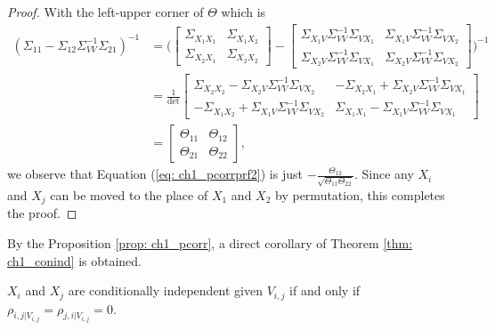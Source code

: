 \begin{proof}
    With the left-upper corner of $\Theta$ which is
    \begin{align*}
        (\Sigma_{11}-\Sigma_{12}\Sigma_{VV}^{-1}\Sigma_{21})^{-1} &= \bigg(\begin{bmatrix}
            \Sigma_{X_1X_1} & \Sigma_{X_1X_2} \\
            \Sigma_{X_2X_1} & \Sigma_{X_2X_2}
        \end{bmatrix}-\begin{bmatrix}
            \Sigma_{X_1V}\Sigma_{VV}^{-1}\Sigma_{VX_1} & \Sigma_{X_1V}\Sigma_{VV}^{-1}\Sigma_{VX_2} \\
            \Sigma_{X_2V}\Sigma_{VV}^{-1}\Sigma_{VX_1} & \Sigma_{X_2V}\Sigma_{VV}^{-1}\Sigma_{VX_2}
        \end{bmatrix}\bigg)^{-1} \\
                &= \frac{1}{\text{det}}\begin{bmatrix}
                    \Sigma_{X_2X_2}-\Sigma_{X_2V}\Sigma_{VV}^{-1}\Sigma_{VX_2} & -\Sigma_{X_2X_1}+\Sigma_{X_2V}\Sigma_{VV}^{-1}\Sigma_{VX_1} \\
                    -\Sigma_{X_1X_2}+\Sigma_{X_1V}\Sigma_{VV}^{-1}\Sigma_{VX_2} & \Sigma_{X_1X_1}-\Sigma_{X_1V}\Sigma_{VV}^{-1}\Sigma_{VX_1}
                \end{bmatrix} \\
                &= \begin{bmatrix}
                    \Theta_{11} & \Theta_{12} \\
                    \Theta_{21} & \Theta_{22}
                \end{bmatrix},
    \end{align*}
    we observe that Equation (\ref{eq: ch1_pcorrprf2}) is just $-\frac{\Theta_{12}}{\sqrt{\Theta_{11}\Theta_{22}}}$.
    Since any $X_i$ and $X_j$ can be moved to the place of $X_1$ and $X_2$ by permutation, this completes the proof. 
\end{proof}

By the Proposition \ref{prop: ch1_pcorr}, a direct corollary of Theorem \ref{thm: ch1_conind} is obtained. 
\begin{corollary}
    $X_i$ and $X_j$ are conditionally independent given $V_{i,j}$ if and only if $\rho_{i,j|V_{i,j}}=\rho_{j,i|V_{i,j}}=0$.
\end{corollary}